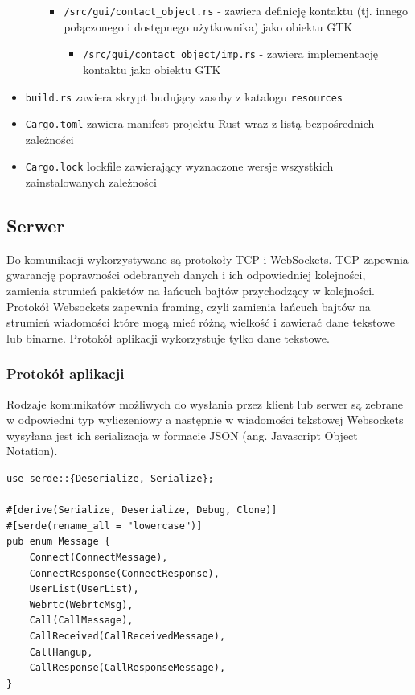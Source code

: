 \begin{itemize}
\begin{itemize}
\begin{itemize}
                        \item \verb|/src/gui/contact_object.rs| - zawiera definicję kontaktu (tj. innego
                              połączonego i dostępnego użytkownika) jako obiektu GTK
                              \begin{itemize}
                                  \item \verb|/src/gui/contact_object/imp.rs| - zawiera
                                        implementację kontaktu jako obiektu GTK
                              \end{itemize}
                    \end{itemize}
          \end{itemize}

    \item \verb|build.rs| zawiera skrypt budujący zasoby z katalogu \verb|resources|
    \item \verb|Cargo.toml| zawiera manifest projektu Rust wraz z listą bezpośrednich
          zależności
    \item \verb|Cargo.lock| lockfile zawierający wyznaczone wersje wszystkich zainstalowanych
          zależności
\end{itemize}

\subsection{Serwer}

Do komunikacji wykorzystywane są protokoły TCP i WebSockets. TCP zapewnia gwarancję poprawności
odebranych danych i ich odpowiedniej kolejności, zamienia strumień pakietów na łańcuch bajtów
przychodzący w kolejności. Protokół Websockets zapewnia framing, czyli zamienia łańcuch bajtów na
strumień wiadomości które mogą mieć różną wielkość i zawierać dane tekstowe lub binarne. Protokół
aplikacji wykorzystuje tylko dane tekstowe.

\subsubsection{Protokół aplikacji}

Rodzaje komunikatów możliwych do wysłania przez klient lub serwer są zebrane w odpowiedni typ
wyliczeniowy a następnie w wiadomości tekstowej Websockets wysyłana jest ich serializacja w formacie
JSON (ang. Javascript Object Notation).

\begin{verbatim}
use serde::{Deserialize, Serialize};

#[derive(Serialize, Deserialize, Debug, Clone)]
#[serde(rename_all = "lowercase")]
pub enum Message {
    Connect(ConnectMessage),
    ConnectResponse(ConnectResponse),
    UserList(UserList),
    Webrtc(WebrtcMsg),
    Call(CallMessage),
    CallReceived(CallReceivedMessage),
    CallHangup,
    CallResponse(CallResponseMessage),
}
\end{verbatim}

